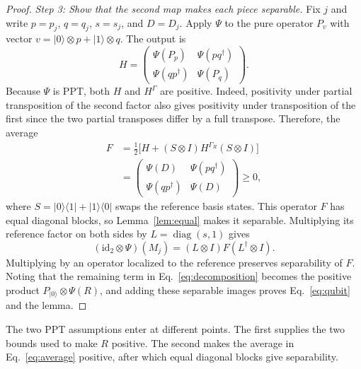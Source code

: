 \documentclass[aps,prl,reprint,superscriptaddress,longbibliography,raggedbottom]{revtex4-2}
\newcommand{\id}{\mathrm{id}}
\newcommand{\ket}[1]{\lvert #1\rangle}
\newcommand{\bra}[1]{\langle #1\rvert}
\begin{document}
\begin{proof}
\emph{Step 3: Show that the second map makes each piece separable.}
Fix $j$ and write $p=p_j$, $q=q_j$, $s=s_j$, and $D=D_j$.
Apply $\Psi$ to the pure operator $P_v$ with
vector $v = \ket0\otimes p+\ket1\otimes q$. The output is
\begin{equation}\label{eq:output}
H=\begin{pmatrix}
\Psi(P_p)&\Psi(pq^\dagger)\\
\Psi(qp^\dagger)&\Psi(P_q)
\end{pmatrix}.
\end{equation}
Because $\Psi$ is PPT, both $H$ and $H^\Gamma$ are positive.
Indeed, positivity under partial transposition of the second factor
also gives positivity under transposition of the first since the two
partial transposes differ by a full transpose. Therefore, the average
\begin{align}
F&=\tfrac12\bigl[H+(S\otimes I)H^{\Gamma_R}(S\otimes I)\bigr]\nonumber\\
&=\begin{pmatrix}
\Psi(D)&\Psi(pq^\dagger)\\
\Psi(qp^\dagger)&\Psi(D)
\end{pmatrix}\ge0, 
\label{eq:average}
\end{align}
where $S=\ket0\bra1+\ket1\bra0$ swaps the reference basis states.
This operator $F$ has equal diagonal blocks, so Lemma~\ref{lem:equal} makes it separable.
Multiplying its reference factor on both sides by
$L=\operatorname{diag}(s,1)$ gives
\begin{equation}\label{eq:filtered}
(\id_2\otimes\Psi)(M_j)=(L\otimes I)F(L^\dagger\otimes I).
\end{equation}
Multiplying by an operator localized to the reference preserves separability of $F$.
Noting that the remaining term in Eq.~\eqref{eq:decomposition} becomes
the positive product $P_{\ket0}\otimes\Psi(R)$, and adding these
separable images proves Eq.~\eqref{eq:qubit} and the lemma.
\end{proof}

The two PPT assumptions enter at different points. The first supplies
the two bounds used to make $R$ positive. The second makes the average
in Eq.~\eqref{eq:average} positive, after which equal diagonal blocks
give separability.
\end{document}
